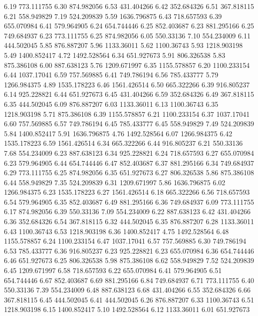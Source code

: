 6.19 	773.111755
6.30 	874.982056
6.53 	431.404266
6.42 	352.684326
6.51 	367.818115
6.21 	558.949829
7.19 	524.209839
5.59 	1636.796875
6.43 	718.657593
6.39 	655.070984
6.41 	579.964905
6.24 	654.744446
6.25 	852.403687
6.23 	881.295166
6.25 	749.684937
6.23 	773.111755
6.25 	874.982056
6.05 	550.33136
7.10 	554.234009
6.11 	444.502045
5.85 	876.887207
5.96 	1133.36011
5.62 	1100.36743
5.93 	1218.903198
5.49 	1400.852417
4.72 	1492.528564
6.34 	651.927673
5.91 	806.326538
5.83 	875.386108
6.00 	887.638123
5.76 	1209.671997
6.35 	1155.578857
6.20 	1100.233154
6.44 	1037.17041
6.59 	757.569885
6.41 	749.786194
6.56 	785.433777
5.79 	1266.984375
4.89 	1535.178223
6.46 	1561.426514
6.50 	665.322266
6.39 	916.805237
6.14 	925.228821
6.44 	651.927673
6.45 	431.404266
6.59 	352.684326
6.49 	367.818115
6.35 	444.502045
6.09 	876.887207
6.03 	1133.36011
6.13 	1100.36743
6.35 	1218.903198
5.71 	875.386108
6.39 	1155.578857
6.21 	1100.233154
6.37 	1037.17041
6.60 	757.569885
6.57 	749.786194
6.45 	785.433777
6.45 	558.949829
7.49 	524.209839
5.84 	1400.852417
5.91 	1636.796875
4.76 	1492.528564
6.07 	1266.984375
6.42 	1535.178223
6.59 	1561.426514
6.34 	665.322266
6.44 	916.805237
6.21 	550.33136
7.68 	554.234009
6.23 	887.638123
6.34 	925.228821
6.24 	718.657593
6.27 	655.070984
6.23 	579.964905
6.44 	654.744446
6.47 	852.403687
6.37 	881.295166
6.34 	749.684937
6.29 	773.111755
6.25 	874.982056
6.35 	651.927673
6.27 	806.326538
5.86 	875.386108
6.44 	558.949829
7.35 	524.209839
6.31 	1209.671997
5.86 	1636.796875
6.02 	1266.984375
6.23 	1535.178223
6.27 	1561.426514
6.18 	665.322266
6.56 	718.657593
6.54 	579.964905
6.35 	852.403687
6.49 	881.295166
6.36 	749.684937
6.09 	773.111755
6.17 	874.982056
6.39 	550.33136
7.09 	554.234009
6.22 	887.638123
6.42 	431.404266
6.36 	352.684326
6.54 	367.818115
6.32 	444.502045
6.35 	876.887207
6.28 	1133.36011
6.43 	1100.36743
6.53 	1218.903198
6.36 	1400.852417
4.75 	1492.528564
6.48 	1155.578857
6.24 	1100.233154
6.47 	1037.17041
6.57 	757.569885
6.30 	749.786194
6.53 	785.433777
6.36 	916.805237
6.23 	925.228821
6.23 	655.070984
6.36 	654.744446
6.46 	651.927673
6.25 	806.326538
5.98 	875.386108
6.62 	558.949829
7.52 	524.209839
6.45 	1209.671997
6.58 	718.657593
6.22 	655.070984
6.41 	579.964905
6.51 	654.744446
6.67 	852.403687
6.69 	881.295166
6.84 	749.684937
6.71 	773.111755
6.40 	550.33136
7.39 	554.234009
6.48 	887.638123
6.68 	431.404266
6.55 	352.684326
6.66 	367.818115
6.45 	444.502045
6.41 	444.502045
6.26 	876.887207
6.33 	1100.36743
6.51 	1218.903198
6.15 	1400.852417
5.10 	1492.528564
6.12 	1133.36011
6.01 	651.927673
